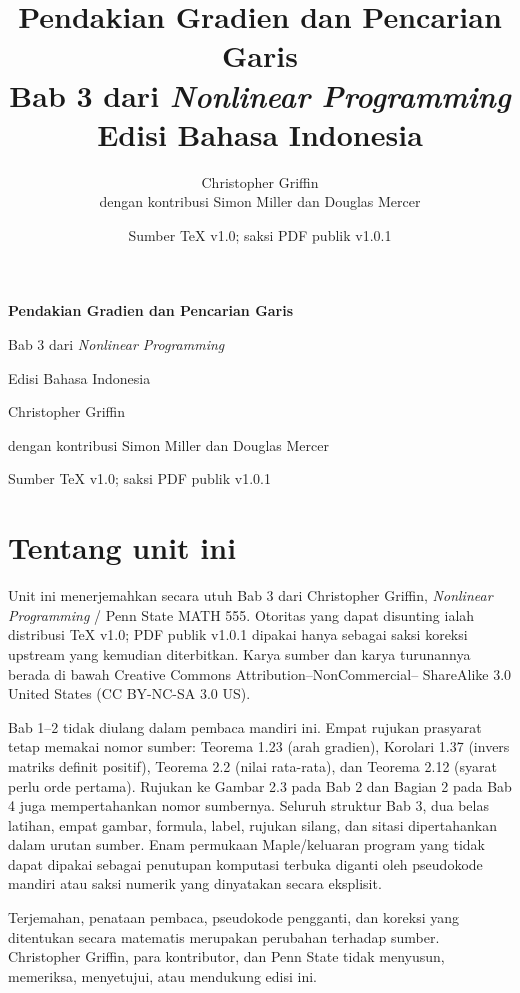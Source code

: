 \documentclass[a4paper,openany,leqno,fleqn,12pt]{amsbook}
\title{Pendakian Gradien dan Pencarian Garis\\
       {\large Bab 3 dari \emph{Nonlinear Programming}\\Edisi Bahasa Indonesia}}
\author{Christopher Griffin\\
{\small dengan kontribusi Simon Miller dan Douglas Mercer}}
\date{Sumber TeX v1.0; saksi PDF publik v1.0.1}
\numberwithin{equation}{chapter}
\numberwithin{figure}{chapter}
\theoremstyle{definition}
\theoremstyle{remark}
\begin{document}
\begin{titlepage}
\thispagestyle{empty}
\centering
\vspace*{0.18\textheight}
{\LARGE\bfseries Pendakian Gradien dan Pencarian Garis\par}
\vspace{0.8em}
{\large Bab 3 dari \emph{Nonlinear Programming}\par}
\vspace{0.8em}
{\Large Edisi Bahasa Indonesia\par}
\vspace{3em}
{\large Christopher Griffin\par}
\vspace{0.75em}
{\small dengan kontribusi Simon Miller dan Douglas Mercer\par}
\vfill
{\small Sumber TeX v1.0; saksi PDF publik v1.0.1\par}
\end{titlepage}

\frontmatter
\chapter*{Tentang unit ini}
Unit ini menerjemahkan secara utuh Bab 3 dari Christopher Griffin,
\emph{Nonlinear Programming} / Penn State MATH 555. Otoritas yang dapat
disunting ialah distribusi TeX v1.0; PDF publik v1.0.1 dipakai hanya sebagai
saksi koreksi upstream yang kemudian diterbitkan. Karya sumber dan karya
turunannya berada di bawah Creative Commons Attribution--NonCommercial--
ShareAlike 3.0 United States (CC BY-NC-SA 3.0 US).

\hypertarget{penn-external-references}{}%
Bab 1--2 tidak diulang dalam pembaca mandiri ini. Empat rujukan prasyarat
tetap memakai nomor sumber: Teorema 1.23 (arah gradien), Korolari 1.37
(invers matriks definit positif), Teorema 2.2 (nilai rata-rata), dan
Teorema 2.12 (syarat perlu orde pertama). Rujukan ke Gambar 2.3 pada Bab 2 dan
Bagian 2 pada Bab 4 juga mempertahankan nomor sumbernya. Seluruh struktur Bab 3, dua belas
latihan, empat gambar, formula, label, rujukan silang, dan sitasi dipertahankan
dalam urutan sumber. Enam permukaan Maple/keluaran program yang tidak dapat
dipakai sebagai penutupan komputasi terbuka diganti oleh pseudokode mandiri
atau saksi numerik yang dinyatakan secara eksplisit.

Terjemahan, penataan pembaca, pseudokode pengganti, dan koreksi yang ditentukan
secara matematis merupakan perubahan terhadap sumber. Christopher Griffin,
para kontributor, dan Penn State tidak menyusun, memeriksa, menyetujui, atau
mendukung edisi ini.
\end{document}
